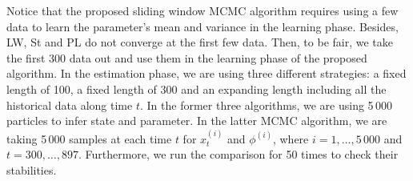 Notice that the proposed sliding window MCMC algorithm requires using a few data to learn the parameter's mean and variance in the learning phase. Besides, LW, St and PL do not converge at the first few data. Then, to be fair, we take the first 300 data out and use them in the learning phase of the proposed algorithm. In the estimation phase, we are using three different strategies: a fixed length of 100, a fixed length of 300 and an expanding length including all the historical data along time $t$. In the former three algorithms, we are using 5\,000 particles to infer state and parameter. In the latter MCMC algorithm, we are taking 5\,000 samples at each time $t$ for  $x_t^{(i)}$ and $\phi^{(i)}$, where $i=1,\ldots,5\,000$ and $t=300,\ldots,897$. Furthermore, we run the comparison for 50 times to check their stabilities. 



